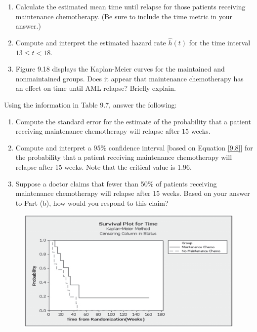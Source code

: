 \documentclass[
]{report}
\begin{document}
\begin{list}{E.}{ \setlength{\itemsep}{1.2em}}
\begin{enumerate}
\begin{table}[!h]
\end{table}
    \item Calculate the estimated mean time until relapse for those patients receiving maintenance chemotherapy. (Be sure to include the time metric in your answer.)
    \item Compute and interpret the estimated hazard rate $\hat{h}(t)$ for the time interval $13 \leq t < 18$.
    \item Figure 9.18 displays the Kaplan-Meier curves for the maintained and nonmaintained groups. Does it appear that maintenance chemotherapy has an effect on time until AML relapse? Briefly explain.
  \end{enumerate}

  \item Using the information in Table 9.7, answer the following:
  \begin{enumerate}
    \item Compute the standard error for the estimate of the probability that a patient receiving maintenance chemotherapy will relapse after 15 weeks.
    \item Compute and interpret a 95\% confidence interval [based on Equation \ref{9.8}] for the probability that a patient receiving maintenance chemotherapy will relapse after 15 weeks. Note that the critical value is 1.96.
    \item Suppose a doctor claims that fewer than 50\% of patients receiving maintenance chemotherapy will relapse after 15 weeks. Based on your answer to Part (b), how would you respond to this claim?
  \end{enumerate}

\begin{figure}

{\centering \includegraphics[width=1\linewidth]{docs/Fig9_18} 

}
\end{figure}
\end{list}
\end{document}
